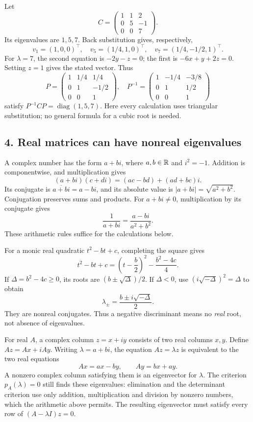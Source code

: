 \begin{example}
Let
\[
 C=\begin{pmatrix}1&1&2\\0&5&-1\\0&0&7\end{pmatrix}.
\]
Its eigenvalues are \(1,5,7\). Back substitution gives, respectively,
\[
 v_1=(1,0,0)^\top,\quad
 v_5=(1/4,1,0)^\top,\quad
 v_7=(1/4,-1/2,1)^\top.
\]
For \(\lambda=7\), the second equation is \(-2y-z=0\);
the first is \(-6x+y+2z=0\). Setting \(z=1\) gives the stated vector.
Thus
\[
 P=\begin{pmatrix}1&1/4&1/4\\0&1&-1/2\\0&0&1\end{pmatrix},
 \quad
 P^{-1}=\begin{pmatrix}1&-1/4&-3/8\\0&1&1/2\\0&0&1\end{pmatrix}
\]
satisfy \(P^{-1}CP=\operatorname{diag}(1,5,7)\).
Here every calculation uses triangular substitution; no general formula
for a cubic root is needed.
\end{example}


\subsection*{4. Real matrices can have nonreal eigenvalues}
A complex number has the form \(a+bi\), where \(a,b\in\mathbb R\) and
\(i^2=-1\). Addition is componentwise, and multiplication gives
\[
 (a+bi)(c+di)=(ac-bd)+(ad+bc)i.
\]
Its conjugate is \(\overline{a+bi}=a-bi\), and its absolute value is
\(|a+bi|=\sqrt{a^2+b^2}\). Conjugation preserves sums and products.
For \(a+bi\ne0\), multiplication by its conjugate gives
\[
 \frac1{a+bi}=\frac{a-bi}{a^2+b^2}.
\]
These arithmetic rules suffice for the calculations below.

For a monic real quadratic \(t^2-bt+c\), completing the square gives
\[
 t^2-bt+c=\left(t-\frac b2\right)^2-\frac{b^2-4c}{4}.
\]
If \(\Delta=b^2-4c\geqslant0\), its roots are
\((b\pm\sqrt\Delta)/2\). If \(\Delta<0\), use
\((i\sqrt{-\Delta})^2=\Delta\) to obtain
\[
 \lambda_\pm=\frac{b\pm i\sqrt{-\Delta}}2.
\]
They are nonreal conjugates. Thus a negative discriminant means
no \emph{real} root, not absence of eigenvalues.

For real \(A\), a complex column \(z=x+iy\) consists of two real
columns \(x,y\). Define \(Az=Ax+iAy\). Writing \(\lambda=a+bi\),
the equation \(Az=\lambda z\) is equivalent to the two real equations
\[
 Ax=ax-by,\qquad Ay=bx+ay.                         \tag{*}
\]
A nonzero complex column satisfying them is an eigenvector for \(\lambda\).
The criterion \(p_A(\lambda)=0\) still finds these eigenvalues:
elimination and the determinant criterion use only addition,
multiplication and division by nonzero numbers, which the arithmetic
above permits. The resulting eigenvector must satisfy every row of
\((A-\lambda I)z=0\).

